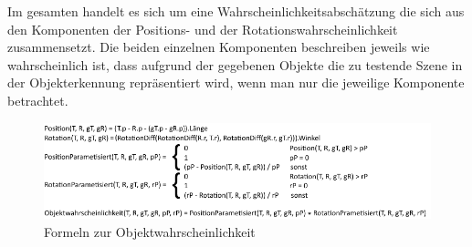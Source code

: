 Im gesamten handelt es sich um eine Wahrscheinlichkeitsabschätzung die sich aus den Komponenten der Positions- und der Rotationswahrscheinlichkeit zusammensetzt. Die beiden einzelnen Komponenten beschreiben jeweils wie wahrscheinlich ist, dass aufgrund der gegebenen Objekte die zu testende Szene in der Objekterkennung repräsentiert wird, wenn man nur die jeweilige Komponente betrachtet.
\begin{figure}
	\centering
	\includegraphics[width=16cm]{bilder/Formeln.pdf}
	\caption{Formeln zur Objektwahrscheinlichkeit}
	\label{img:formelnObj}
\end{figure}

